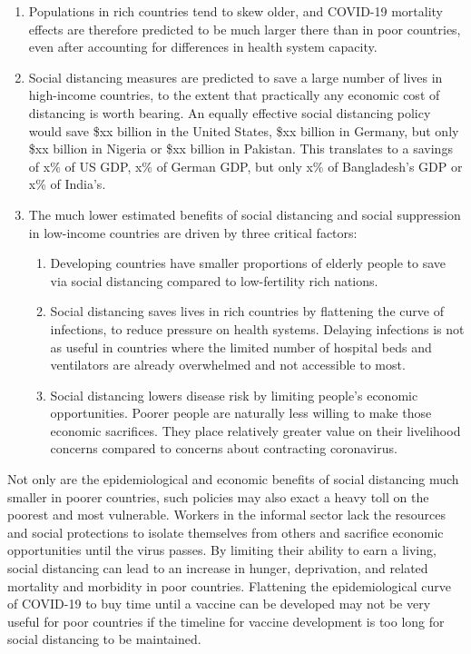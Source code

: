 \documentclass[11pt]{article}
\begin{document}
\begin{enumerate}
    \item Populations in rich countries tend to skew older, and COVID-19 mortality effects are therefore predicted to be much larger there than in poor countries, even after accounting for differences in health system capacity.  
    \item Social distancing measures are predicted to save a large number of lives in high-income countries, to the extent that practically any economic cost of distancing is worth bearing. An equally effective social distancing policy would save \$xx billion in the United States, \$xx billion in Germany, but only \$xx billion in Nigeria or \$xx billion in Pakistan. This translates to a savings of x\% of US GDP, x\% of German GDP, but only x\% of Bangladesh's GDP or x\% of India's.  
    \item The much lower estimated benefits of social distancing and social suppression in low-income countries are driven by three critical factors:
        \begin{enumerate}
            \item Developing countries have smaller proportions of elderly people to save via social distancing compared to low-fertility rich nations.
            \item Social distancing saves lives in rich countries by flattening the curve of infections, to reduce pressure on health systems. Delaying infections is not as useful in countries where the limited number of hospital beds and ventilators are already overwhelmed and not accessible to most.
            \item Social distancing lowers disease risk by limiting people's economic opportunities. Poorer people are naturally less willing to make those economic sacrifices. They place relatively greater value on their livelihood concerns compared to concerns about contracting coronavirus.    
        \end{enumerate}
\end{enumerate}

Not only are the epidemiological and economic benefits of social distancing much smaller in poorer countries, such policies may also exact a heavy toll on the poorest and most vulnerable. Workers in the informal sector lack the resources and social protections to isolate themselves from others and sacrifice economic opportunities until the virus passes. By limiting their ability to earn a living, social distancing can lead to an increase in hunger, deprivation, and related mortality and morbidity in poor countries. Flattening the epidemiological curve of COVID-19 to buy time until a vaccine can be developed may not be very useful for poor countries if the timeline for vaccine development is too long for social distancing to be maintained.
\end{document}
